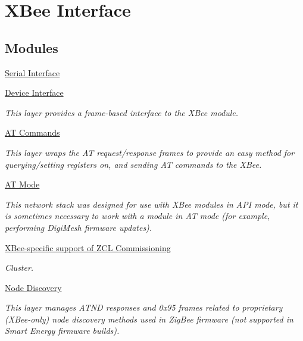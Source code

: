 \hypertarget{group__xbee}{}\section{X\+Bee Interface}
\label{group__xbee}
\subsection*{Modules}
\begin{DoxyCompactItemize}
\item 
\hyperlink{group__xbee__serial}{Serial Interface}
\item 
\hyperlink{group__xbee__device}{Device Interface}
\begin{DoxyCompactList}\small\item\em This layer provides a frame-\/based interface to the X\+Bee module. \end{DoxyCompactList}\item 
\hyperlink{group__xbee__atcmd}{A\+T Commands}
\begin{DoxyCompactList}\small\item\em This layer wraps the AT request/response frames to provide an easy method for querying/setting registers on, and sending AT commands to the X\+Bee. \end{DoxyCompactList}\item 
\hyperlink{group__xbee__atmode}{A\+T Mode}
\begin{DoxyCompactList}\small\item\em This network stack was designed for use with X\+Bee modules in A\+PI mode, but it is sometimes necessary to work with a module in AT mode (for example, performing Digi\+Mesh firmware updates). \end{DoxyCompactList}\item 
\hyperlink{group__xbee__commissioning}{X\+Bee-\/specific support of Z\+C\+L Commissioning}
\begin{DoxyCompactList}\small\item\em Cluster. \end{DoxyCompactList}\item 
\hyperlink{group__xbee__discovery}{Node Discovery}
\begin{DoxyCompactList}\small\item\em This layer manages A\+T\+ND responses and 0x95 frames related to proprietary (X\+Bee-\/only) node discovery methods used in Zig\+Bee firmware (not supported in Smart Energy firmware builds). \end{DoxyCompactList}\item 

\end{DoxyCompactItemize}
